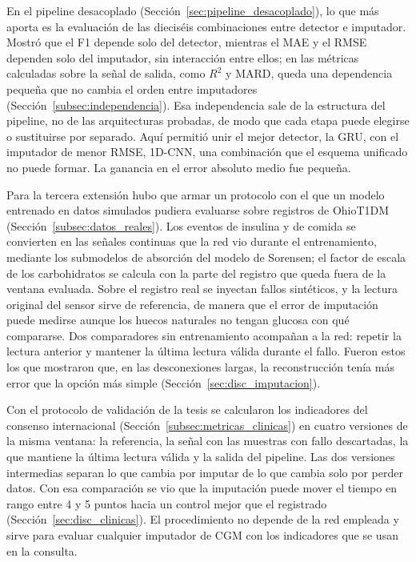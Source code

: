 \documentclass{report}
\begin{document}
En el pipeline desacoplado (Sección~\ref{sec:pipeline_desacoplado}), lo que más aporta es la evaluación de las dieciséis combinaciones entre detector e imputador. Mostró que el F1 depende solo del detector, mientras el MAE y el RMSE dependen solo del imputador, sin interacción entre ellos; en las métricas calculadas sobre la señal de salida, como $R^2$ y MARD, queda una dependencia pequeña que no cambia el orden entre imputadores (Sección~\ref{subsec:independencia}). Esa independencia sale de la estructura del pipeline, no de las arquitecturas probadas, de modo que cada etapa puede elegirse o sustituirse por separado. Aquí permitió unir el mejor detector, la GRU, con el imputador de menor RMSE, 1D-CNN, una combinación que el esquema unificado no puede formar. La ganancia en el error absoluto medio fue pequeña.

Para la tercera extensión hubo que armar un protocolo con el que un modelo entrenado en datos simulados pudiera evaluarse sobre registros de OhioT1DM (Sección~\ref{subsec:datos_reales}). Los eventos de insulina y de comida se convierten en las señales continuas que la red vio durante el entrenamiento, mediante los submodelos de absorción del modelo de Sorensen; el factor de escala de los carbohidratos se calcula con la parte del registro que queda fuera de la ventana evaluada. Sobre el registro real se inyectan fallos sintéticos, y la lectura original del sensor sirve de referencia, de manera que el error de imputación puede medirse aunque los huecos naturales no tengan glucosa con qué compararse. Dos comparadores sin entrenamiento acompañan a la red: repetir la lectura anterior y mantener la última lectura válida durante el fallo. Fueron estos los que mostraron que, en las desconexiones largas, la reconstrucción tenía más error que la opción más simple (Sección~\ref{sec:disc_imputacion}).
 
Con el protocolo de validación de la tesis se calcularon los indicadores del consenso internacional (Sección~\ref{subsec:metricas_clinicas}) en cuatro versiones de la misma ventana: la referencia, la señal con las muestras con fallo descartadas, la que mantiene la última lectura válida y la salida del pipeline. Las dos versiones intermedias separan lo que cambia por imputar de lo que cambia solo por perder datos. Con esa comparación se vio que la imputación puede mover el tiempo en rango entre 4 y 5 puntos hacia un control mejor que el registrado (Sección~\ref{sec:disc_clinicas}). El procedimiento no depende de la red empleada y sirve para evaluar cualquier imputador de CGM con los indicadores que se usan en la consulta.
\end{document}
